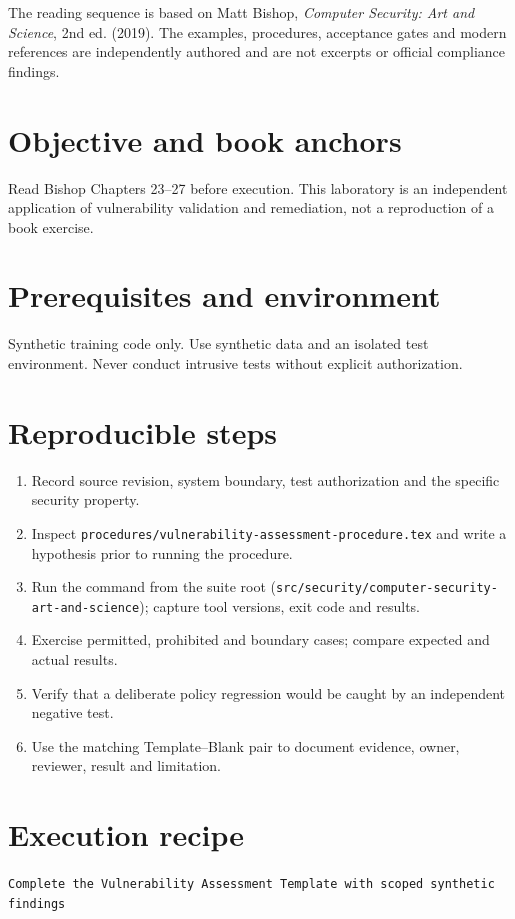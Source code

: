 \documentclass[10pt,letterpaper]{article}
\begin{document}
\makedoctocpage
\begin{notebox}
The reading sequence is based on Matt Bishop, \emph{Computer Security: Art and Science}, 2nd ed. (2019). The examples, procedures, acceptance gates and modern references are independently authored and are not excerpts or official compliance findings.
\end{notebox}
\section{Objective and book anchors}
Read Bishop Chapters 23--27 before execution. This laboratory is an independent application of vulnerability validation and remediation, not a reproduction of a book exercise.
\section{Prerequisites and environment}
Synthetic training code only. Use synthetic data and an isolated test environment. Never conduct intrusive tests without explicit authorization.
\section{Reproducible steps}
\begin{enumerate}
\item Record source revision, system boundary, test authorization and the specific security property.
\item Inspect \texttt{procedures/vulnerability-assessment-procedure.tex} and write a hypothesis prior to running the procedure.
\item Run the command from the suite root (\texttt{src/security/computer-security-art-and-science}); capture tool versions, exit code and results.
\item Exercise permitted, prohibited and boundary cases; compare expected and actual results.
\item Verify that a deliberate policy regression would be caught by an independent negative test.
\item Use the matching Template--Blank pair to document evidence, owner, reviewer, result and limitation.
\end{enumerate}
\section{Execution recipe}
\begin{viewbox}\raggedright\small\texttt{Complete the Vulnerability Assessment Template with scoped synthetic findings}\end{viewbox}
\end{document}
